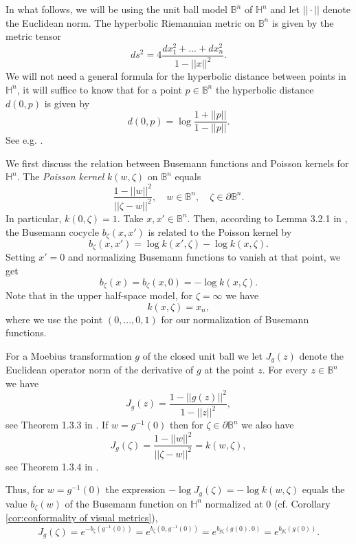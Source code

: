 \documentclass[12pt]{amsbook}%
\theoremstyle{definition}
\theoremstyle{remark}
\numberwithin{section}{chapter}
\numberwithin{subsection}{section}
\numberwithin{figure}{chapter}
\def\bB{{\mathbb{B}}}
\def\bH{{\mathbb{H}}}
\begin{document}
{{In what follows, we will be using the unit ball model $\mathbb B^n$ of $\bH^n$ and let $||\cdot||$ denote the Euclidean norm.  
The hyperbolic Riemannian metric on $\mathbb B^n$ is given by the metric tensor
$$
ds^2= 4\frac{dx_1^2+...+dx_n^2}{1-||x||^2}. 
$$
We will not need a general formula for the hyperbolic distance between points in $\bH^n$, it will suffice to know that 
for a point $p\in \mathbb B^n$ the hyperbolic distance $d(0, p)$ is given by  
\begin{equation}\label{eq:distance} 
d(0, p)= \log \frac{1+||p||}{1-||p||}.
\end{equation}
See e.g. \cite[p. 14]{nicholls}. 


We first discuss the relation between Busemann functions and Poisson kernels for $\bH^n$.  The {\em Poisson kernel} $k(w,\zeta)$ on $\bB^n$ 
equals 
$$
\frac{1-||w||^2}{||\zeta-w||^2},  \quad w\in \mathbb B^n, \quad \zeta\in \partial \mathbb B^n. 
$$
In particular, $k(0,\zeta)=1$. Take $x, x'\in \mathbb B^n$. Then, according to  Lemma 3.2.1 in \cite{nicholls}, the Busemann cocycle $b_\zeta(x,x')$ is related to the 
Poisson kernel by 
$$
b_\zeta(x,x')= \log k(x',\zeta) - \log k(x,\zeta). 
$$
Setting $x'=0$ and normalizing Busemann functions to vanish at that point, we get
$$
b_\zeta(x)=b_\zeta(x,0)= - \log k(x,\zeta). 
$$
Note that in the upper half-space model, for $\zeta=\infty$ we have
$$
k(x,\zeta)= x_n, 
$$ 
where we use the point $(0,...,0,1)$ for our normalization of Busemann functions. 


\medskip 
For a Moebius transformation $g$ of the closed unit ball we let $J_g(z)$ denote the Euclidean operator norm of the derivative of $g$ at the point $z$. 
For every $z\in \mathbb B^n$ we have 
\begin{equation}\label{eq:Jacobian} 
J_g(z)= \frac{1-||g(z)||^2}{1-||z||^2}, 
\end{equation}
see Theorem 1.3.3 in \cite{nicholls}. 
If $w=g^{-1}(0)$ then for $\zeta\in \partial \mathbb B^n$ we also have
\begin{equation}\label{eq:Jac0}
J_g(\zeta)= \frac{1-||w||^2}{||\zeta-w||^2}=k(w,\zeta),
\end{equation}
see Theorem 1.3.4  in \cite{nicholls}. 


 
Thus, for $w=g^{-1}(0)$ the expression $-\log J_g(\zeta)= -\log k(w,\zeta)$ 
equals the value $b_\zeta(w)$ of the Busemann function on $\bH^n$ normalized at $0$ (cf. Corollary \ref{cor:conformality of visual metrics}),  
\begin{equation}\label{eq:J_g}
J_g(\zeta)= e^{-b_\zeta(g^{-1}(0))}= e^{b_\zeta(0,g^{-1}(0))}= e^{b_{g\zeta}(g(0),0)}= e^{b_{g\zeta}(g(0))}. 
\end{equation}





}}
\end{document}
